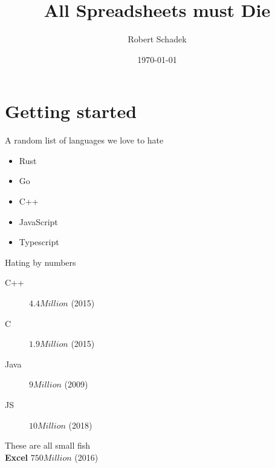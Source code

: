 \documentclass[aspectratio=169,notes]{beamer}
\title{All Spreadsheets must Die}
\date{\today}
\author{Robert Schadek}
\begin{document}
	\maketitle

	\section{Getting started}
	\begin{frame}{A random list of languages we love to hate}
		\begin{itemize}
			\item Rust
			\item Go
			\item C++
			\item JavaScript
			\item Typescript
		\end{itemize}
	\end{frame}


	\begin{frame}{Hating by numbers}
		\begin{description}
			\item[C++] $4.4 Million$ (2015)
			\item[C] $1.9 Million$ (2015)
			\item[Java] $9 Million$ (2009)	
			\item[JS] $10 Million$ (2018)
		\end{description}
	\end{frame}
	
	\begin{frame}
		\begin{center}
		\huge
		These are all small fish\\[2cm]
		\pause
		\textbf{Excel} $750 Million$ (2016)
		\end{center}
	\end{frame}
\end{document}

